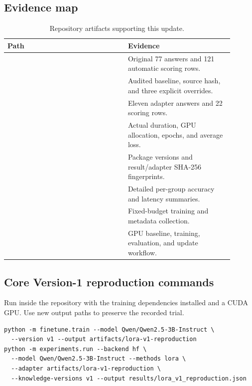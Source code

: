 \documentclass[10pt,letterpaper]{article}
\begin{document}
\subsection{Evidence map}
\begin{table}[htbp]\centering\small
\caption{Repository artifacts supporting this update.}
\begin{tabular}{P{0.48\linewidth}P{0.42\linewidth}}\toprule
Path & Evidence\\\midrule
{} & Original 77 answers and 121 automatic scoring rows.\\
 & Audited baseline, source hash, and three explicit overrides.\\
 & Eleven adapter answers and 22 scoring rows.\\
 & Actual duration, GPU allocation, epochs, and average loss.\\
 & Package versions and result/adapter SHA-256 fingerprints.\\
 & Detailed per-group accuracy and latency summaries.\\
 & Fixed-budget training and metadata collection.\\
 & GPU baseline, training, evaluation, and update workflow.\\\bottomrule
\end{tabular}
\end{table}

\subsection{Core Version-1 reproduction commands}
Run inside the repository with the training dependencies installed and a CUDA GPU. Use new output paths to preserve the recorded trial.
\begin{small}\begin{verbatim}
python -m finetune.train --model Qwen/Qwen2.5-3B-Instruct \
  --version v1 --output artifacts/lora-v1-reproduction
python -m experiments.run --backend hf \
  --model Qwen/Qwen2.5-3B-Instruct --methods lora \
  --adapter artifacts/lora-v1-reproduction \
  --knowledge-versions v1 --output results/lora_v1_reproduction.json
\end{verbatim}\end{small}
\end{document}
